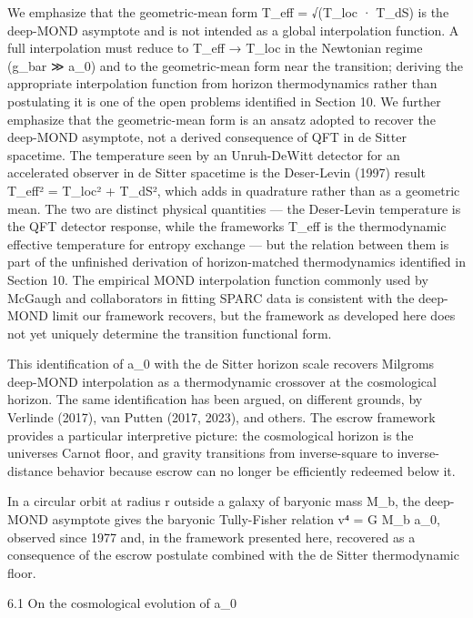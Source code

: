 \documentclass[11pt]{article}
\begin{document}
We emphasize that the geometric-mean form T\_eff = √(T\_loc · T\_dS) is the deep-MOND asymptote and is not intended as a global interpolation function. A full interpolation must reduce to T\_eff → T\_loc in the Newtonian regime (g\_bar ≫ a\_0) and to the geometric-mean form near the transition; deriving the appropriate interpolation function from horizon thermodynamics rather than postulating it is one of the open problems identified in Section 10. We further emphasize that the geometric-mean form is an ansatz adopted to recover the deep-MOND asymptote, not a derived consequence of QFT in de Sitter spacetime. The temperature seen by an Unruh-DeWitt detector for an accelerated observer in de Sitter spacetime is the Deser-Levin (1997) result T\_eff² = T\_loc² + T\_dS², which adds in quadrature rather than as a geometric mean. The two are distinct physical quantities --- the Deser-Levin temperature is the QFT detector response, while the framework\textquotesingle s T\_eff is the thermodynamic effective temperature for entropy exchange --- but the relation between them is part of the unfinished derivation of horizon-matched thermodynamics identified in Section 10. The empirical MOND interpolation function commonly used by McGaugh and collaborators in fitting SPARC data is consistent with the deep-MOND limit our framework recovers, but the framework as developed here does not yet uniquely determine the transition functional form.

This identification of a\_0 with the de Sitter horizon scale recovers Milgrom\textquotesingle s deep-MOND interpolation as a thermodynamic crossover at the cosmological horizon. The same identification has been argued, on different grounds, by Verlinde (2017), van Putten (2017, 2023), and others. The escrow framework provides a particular interpretive picture: the cosmological horizon is the universe\textquotesingle s Carnot floor, and gravity transitions from inverse-square to inverse-distance behavior because escrow can no longer be efficiently redeemed below it.

In a circular orbit at radius r outside a galaxy of baryonic mass M\_b, the deep-MOND asymptote gives the baryonic Tully-Fisher relation v⁴ = G M\_b a\_0, observed since 1977 and, in the framework presented here, recovered as a consequence of the escrow postulate combined with the de Sitter thermodynamic floor.

6.1 On the cosmological evolution of a\_0
\end{document}
